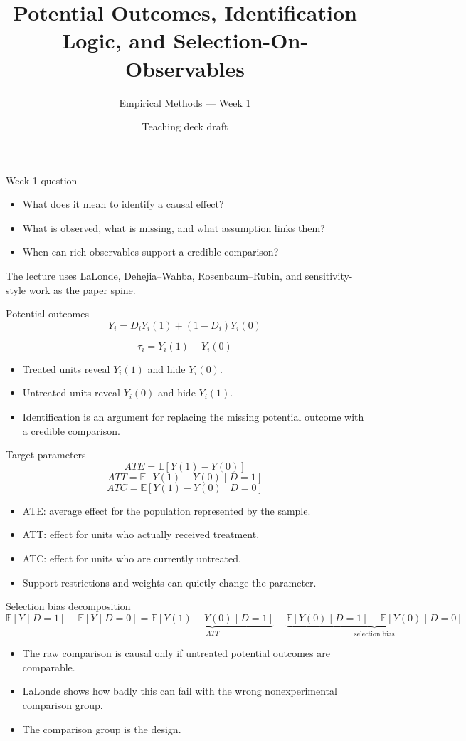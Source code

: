 \documentclass[aspectratio=169,11pt]{beamer}
\title{Potential Outcomes, Identification Logic, and Selection-On-Observables}
\subtitle{Empirical Methods --- Week 1}
\author{Teaching deck draft}
\date{}
\newcommand{\E}{\mathbb{E}}
\begin{document}
\begin{frame}
  \titlepage
\end{frame}

\begin{frame}{Week 1 question}
\begin{itemize}
    \item What does it mean to identify a causal effect?
    \item What is observed, what is missing, and what assumption links them?
    \item When can rich observables support a credible comparison?
\end{itemize}

\medskip
The lecture uses LaLonde, Dehejia--Wahba, Rosenbaum--Rubin, and sensitivity-style work as the paper spine.
\end{frame}

\begin{frame}{Potential outcomes}
\[
Y_i = D_iY_i(1) + (1-D_i)Y_i(0)
\]

\[
\tau_i = Y_i(1)-Y_i(0)
\]

\begin{itemize}
    \item Treated units reveal $Y_i(1)$ and hide $Y_i(0)$.
    \item Untreated units reveal $Y_i(0)$ and hide $Y_i(1)$.
    \item Identification is an argument for replacing the missing potential outcome with a credible comparison.
\end{itemize}
\end{frame}

\begin{frame}{Target parameters}
\[
ATE = \E[Y(1)-Y(0)]
\]
\[
ATT = \E[Y(1)-Y(0)\mid D=1]
\]
\[
ATC = \E[Y(1)-Y(0)\mid D=0]
\]

\begin{itemize}
    \item ATE: average effect for the population represented by the sample.
    \item ATT: effect for units who actually received treatment.
    \item ATC: effect for units who are currently untreated.
    \item Support restrictions and weights can quietly change the parameter.
\end{itemize}
\end{frame}

\begin{frame}{Selection bias decomposition}
\[
\E[Y\mid D=1] - \E[Y\mid D=0]
=
\underbrace{\E[Y(1)-Y(0)\mid D=1]}_{ATT}
+
\underbrace{\E[Y(0)\mid D=1]-\E[Y(0)\mid D=0]}_{\text{selection bias}}
\]

\begin{itemize}
    \item The raw comparison is causal only if untreated potential outcomes are comparable.
    \item LaLonde shows how badly this can fail with the wrong nonexperimental comparison group.
    \item The comparison group is the design.
\end{itemize}
\end{frame}
\end{document}
